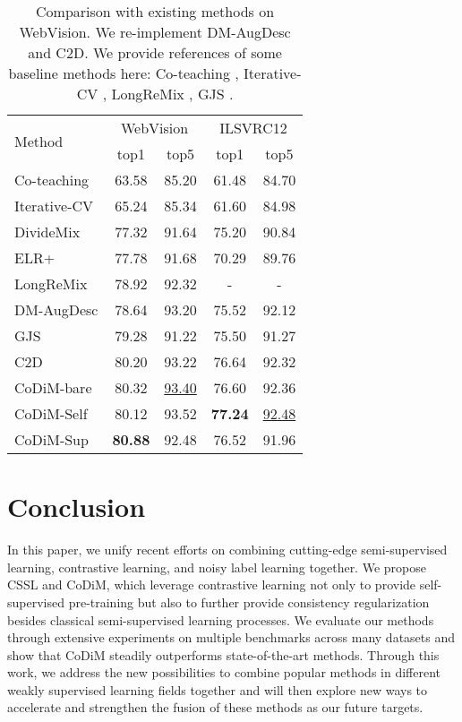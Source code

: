 \documentclass[letterpaper]{article} \usepackage{aaai22}  \usepackage{times}  \usepackage{helvet}  \usepackage{courier}  \usepackage[hyphens]{url}  \usepackage{graphicx} \usepackage{subfigure}
\begin{document}
\begin{table}[h]
\begin{center}
\begin{tabular}{lcccc}
\hline
\multirow{2}{*}{Method} & \multicolumn{2}{c}{WebVision} & \multicolumn{2}{c}{ILSVRC12} \\
 & top1 & top5 & top1 & top5 \\
\hline
Co-teaching & 63.58 & 85.20 & 61.48 & 84.70 \\
Iterative-CV & 65.24 & 85.34 & 61.60 & 84.98 \\
DivideMix & 77.32 & 91.64 & 75.20 & 90.84 \\
ELR+ & 77.78 & 91.68 & 70.29 & 89.76 \\
LongReMix & 78.92 & 92.32 & - & - \\
DM-AugDesc & 78.64 & 93.20 & 75.52 & 92.12 \\ GJS & 79.28 & 91.22 & 75.50 & 91.27 \\
C2D & 80.20 & 93.22 & 76.64 & 92.32 \\ \hline
CoDiM-bare  & 80.32 & \underline{93.40} & 76.60 & 92.36 \\CoDiM-Self & 80.12 & 93.52 & \textbf{77.24} & \underline{92.48}\\ CoDiM-Sup & \textbf{80.88} & 92.48 & 76.52 & 91.96 \\
\hline
\end{tabular}
\end{center}
\caption{Comparison with existing methods on WebVision. We re-implement DM-AugDesc and C2D. We provide references of some baseline methods here: Co-teaching \cite{han2018co}, Iterative-CV \cite{chen2019understanding}, LongReMix \cite{cordeiro2021longremix}, GJS \cite{englesson2021generalized}.}
\label{tab:table4}
\end{table}


\section{Conclusion}
In this paper, we unify recent efforts on combining cutting-edge semi-supervised learning, contrastive learning, and noisy label learning together. We propose CSSL and CoDiM, which leverage contrastive learning not only to provide self-supervised pre-training but also to further provide consistency regularization besides classical semi-supervised learning processes. We evaluate our methods through extensive experiments on multiple benchmarks across many datasets and show that CoDiM steadily outperforms state-of-the-art methods. Through this work, we address the new possibilities to combine popular methods in different weakly supervised learning fields together and will then explore new ways to accelerate and strengthen the fusion of these methods as our future targets. 
\end{document}
